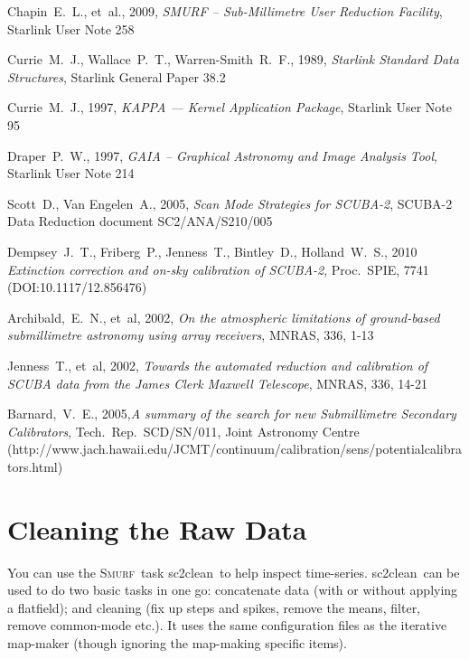 \documentclass[twoside,11pt]{article}
\newcommand{\htmladdnormallink}[2]{#1}
\newcommand{\xref}[3]{#1}
\newcommand{\xlabel}[1]{}
\renewcommand{\_}{\texttt{\symbol{95}}}
\newcommand{\smurf}{\xref{\textsc{Smurf}}{sun258}{}}
\newcommand{\task}[1]{\textsf{#1}}
\newcommand{\clean}{\xref{\task{sc2clean}}{sun258}{SC2CLEAN}}
\begin{document}
\begin{thebibliography}{}

Chapin~E.~L., et~al., 2009, \textit{SMURF -- Sub-Millimetre User Reduction
Facility},
\xref{Starlink User Note 258}{sun258}{}

Currie~M.~J., Wallace~P.~T., Warren-Smith~R.~F., 1989, \textit{Starlink Standard Data Structures}, \xref{Starlink General Paper 38.2}{sgp38}{}

Currie~M.~J., 1997, \textit{KAPPA --- Kernel Application Package},
\xref{Starlink User Note 95}{sun95}{}

Draper~P.~W., 1997, \textit{GAIA -- Graphical Astronomy and Image Analysis Tool},
\xref{Starlink User Note 214}{sun214}{}

Scott~D., Van Engelen~A., 2005, \textit{Scan Mode Strategies for
  SCUBA-2}, SCUBA-2 Data Reduction document SC2/ANA/S210/005

Dempsey~J.~T., Friberg~P., Jenness~T., Bintley~D., Holland~W.~S., 2010
\textit{Extinction correction and on-sky calibration of SCUBA-2},
Proc.\ SPIE, 7741 (DOI:10.1117/12.856476)

Archibald,~E.~N., et~al, 2002, \textit{On the atmospheric limitations of ground-based submillimetre astronomy using array receivers},
MNRAS, 336, 1-13

Jenness~T., et~al, 2002, \textit{Towards the automated reduction and calibration of SCUBA data from the James Clerk Maxwell Telescope},
MNRAS, 336, 14-21

Barnard,~V.~E., 2005,\textit{A summary of the search for new Submillimetre Secondary Calibrators},
Tech.\ Rep.\ SCD/SN/011, Joint Astronomy Centre
(\htmladdnormallink{http://www.jach.hawaii.edu/JCMT/continuum/calibration/sens/potentialcalibrators.html}{http://www.jach.hawaii.edu/JCMT/continuum/calibration/sens/potentialcalibrators.html})

\end{thebibliography}

\newpage
\appendix

\section{\xlabel{app_clean}Cleaning the Raw Data}
\label{app:clean}

You can use the \smurf\ task \clean\ to help inspect time-series. \clean\ can be used to do two basic tasks in one go: concatenate data (with or without applying a flatfield); and cleaning (fix up steps and spikes, remove the means, filter, remove common-mode etc.). It uses the same configuration files as the iterative map-maker (though ignoring the map-making specific items).
\end{document}
